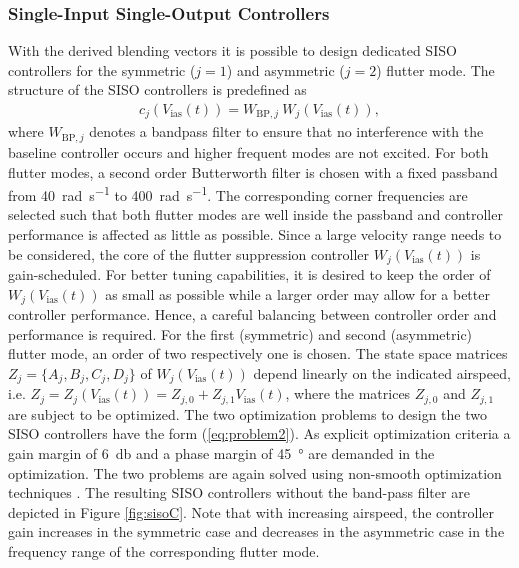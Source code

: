 \documentclass[aerospace,article,submit,moreauthors,pdftex,10pt,a4paper]{Definitions/mdpi}
\begin{document}
\subsubsection{Single-Input Single-Output Controllers}
With the derived blending vectors it is possible to design dedicated SISO controllers for the symmetric ($j=1$) and asymmetric ($j=2$) flutter mode. 
The structure of the \ac{SISO} controllers is predefined as
%
\begin{align}
  c_j (V_{\text{ias}}(t))=W_{\text{BP},j} ~ W_{j}(V_{\text{ias}}(t)),
\end{align}
%
where $W_{\text{BP},j}$ denotes a bandpass filter to ensure that no interference with the baseline controller occurs and higher frequent modes are not excited. For both flutter modes, a second order Butterworth filter is chosen with a fixed passband from \SI{40}{\radian\per\second} to \SI{400}{\radian\per\second}. The corresponding corner frequencies are selected such that both flutter modes are well inside the passband and controller performance is affected as little as possible. 
Since a large velocity range needs to be considered, the core of the flutter suppression controller $W_{j}(V_{\text{ias}}(t))$ is gain-scheduled. For better tuning capabilities, it is desired to keep the order of $W_{j}(V_{\text{ias}}(t))$ as small as possible while a larger order may allow for a better controller performance. Hence, a careful balancing between controller order and performance is required. For the first (symmetric) and second (asymmetric) flutter mode, an order of two respectively one is chosen. 
The state space matrices $Z_j=\{A_j,B_j,C_j,D_j\}$ of $W_{j}(V_{\text{ias}}(t))$ depend linearly on the indicated airspeed, i.e. 
$Z_j=Z_j(V_{\text{ias}}(t)) = Z_{j,0}+Z_{j,1} V_{\text{ias}}(t)$, where the matrices $Z_{j,0}$ and $Z_{j,1}$ are subject to be optimized.
The two optimization problems to design the two SISO controllers have the form (\ref{eq:problem2}). As explicit optimization criteria a gain margin of \SI{6}{\decibel} and a phase margin of \SI{45}{\degree} are demanded in the optimization. The two problems are again solved using non-smooth optimization techniques \cite{Apkarian15}. The resulting \ac{SISO} controllers without the band-pass filter are depicted in Figure \ref{fig:sisoC}. Note that with increasing airspeed, the controller gain increases in the symmetric case and decreases in the asymmetric case in the frequency range of the corresponding flutter mode. 
%
%
\end{document}
